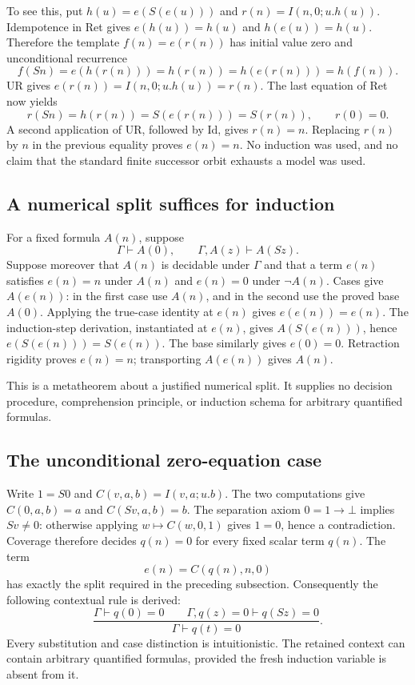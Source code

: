 \documentclass[11pt]{article}
\begin{document}
To see this, put $h(u)=e(S(e(u)))$ and $r(n)=I(n,0;u.h(u))$.
Idempotence in Ret gives $e(h(u))=h(u)$ and $h(e(u))=h(u)$.
Therefore the template $f(n)=e(r(n))$ has initial value zero and
unconditional recurrence
\[
 f(Sn)=e(h(r(n)))=h(r(n))=h(e(r(n)))=h(f(n)).
\]
UR gives $e(r(n))=I(n,0;u.h(u))=r(n)$.
The last equation of Ret now yields
\[
 r(Sn)=h(r(n))=S(e(r(n)))=S(r(n)),\qquad r(0)=0.
\]
A second application of UR, followed by Id, gives $r(n)=n$.
Replacing $r(n)$ by $n$ in the previous equality proves $e(n)=n$.
No induction was used, and no claim that the standard finite successor
orbit exhausts a model was used.

\subsection{A numerical split suffices for induction}
For a fixed formula $A(n)$, suppose
\[
 \Gamma\vdash A(0),\qquad \Gamma,A(z)\vdash A(Sz).
\]
Suppose moreover that $A(n)$ is decidable under $\Gamma$ and that a term
$e(n)$ satisfies $e(n)=n$ under $A(n)$ and $e(n)=0$ under $\neg A(n)$.
Cases give $A(e(n))$: in the first case use $A(n)$, and in the second
use the proved base $A(0)$.  Applying the true-case identity at $e(n)$
gives $e(e(n))=e(n)$.  The induction-step derivation, instantiated at
$e(n)$, gives $A(S(e(n)))$, hence $e(S(e(n)))=S(e(n))$.
The base similarly gives $e(0)=0$.  Retraction rigidity proves $e(n)=n$;
transporting $A(e(n))$ gives $A(n)$.

This is a metatheorem about a justified numerical split.  It supplies no
decision procedure, comprehension principle, or induction schema for
arbitrary quantified formulas.

\subsection{The unconditional zero-equation case}
Write $1=S0$ and $C(v,a,b)=I(v,a;u.b)$.  The two computations give
$C(0,a,b)=a$ and $C(Sv,a,b)=b$.
The separation axiom $0=1\to\bot$ implies $Sv\ne0$: otherwise applying
$w\mapsto C(w,0,1)$ gives $1=0$, hence a contradiction.
Coverage therefore decides $q(n)=0$ for every fixed scalar term $q(n)$.
The term
\[
                             e(n)=C(q(n),n,0)
\]
has exactly the split required in the preceding subsection.
Consequently the following contextual rule is derived:
\[
 \frac{\Gamma\vdash q(0)=0\qquad
       \Gamma,q(z)=0\vdash q(Sz)=0}
      {\Gamma\vdash q(t)=0}.                            \tag{ZI}
\]
Every substitution and case distinction is intuitionistic.  The retained
context can contain arbitrary quantified formulas, provided the fresh
induction variable is absent from it.
\end{document}
